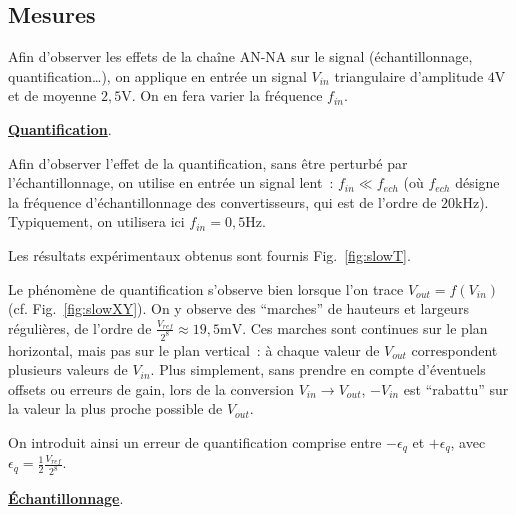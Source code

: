 \documentclass{article}
\begin{document}
\subsection{Mesures}


Afin d'observer les effets de la chaîne AN-NA sur le signal (échantillonnage, quantification\dots), on applique en entrée un signal $V_{in}$ triangulaire d'amplitude $4\mathrm{V}$ et de moyenne $2,5\mathrm{V}$. On en fera varier la fréquence $f_{in}$.

\noindent \textbf{\underline{Quantification}}.

Afin d'observer l'effet de la quantification, sans être perturbé par l'échantillonnage, on utilise en entrée un signal lent~: $f_{in}\ll f_{ech}$ (où $f_{ech}$ désigne la fréquence d'échantillonnage des convertisseurs, qui est de l'ordre de $20\mathrm{kHz}$). Typiquement, on utilisera ici $f_{in} = \mathrm{0,5 Hz}$.

Les résultats expérimentaux obtenus sont fournis Fig.~\ref{fig:slowT}.


Le phénomène de quantification s'observe bien lorsque l'on trace $V_{out}=f(V_{in})$ (cf. Fig.~\ref{fig:slowXY}). On y observe des ``marches'' de hauteurs et largeurs régulières, de l'ordre de $\frac{V_{ref}}{2^8}\approx\mathrm{19,5 mV}$. Ces marches sont continues sur le plan horizontal, mais pas sur le plan vertical~: à chaque valeur de $V_{out}$ correspondent plusieurs valeurs de $V_{in}$. Plus simplement, sans prendre en compte d'éventuels offsets ou erreurs de gain, lors de la conversion $V_{in}\rightarrow V_{out}$, $-V_{in}$ est ``rabattu'' sur la valeur la plus proche possible de $V_{out}$.

On introduit ainsi un erreur de quantification comprise entre $-\epsilon_q$ et $+\epsilon_q$, avec ${\epsilon_q = \frac{1}{2}\frac{V_{ref}}{2^8}}$.



\noindent \textbf{\underline{Échantillonnage}}.
\end{document}
